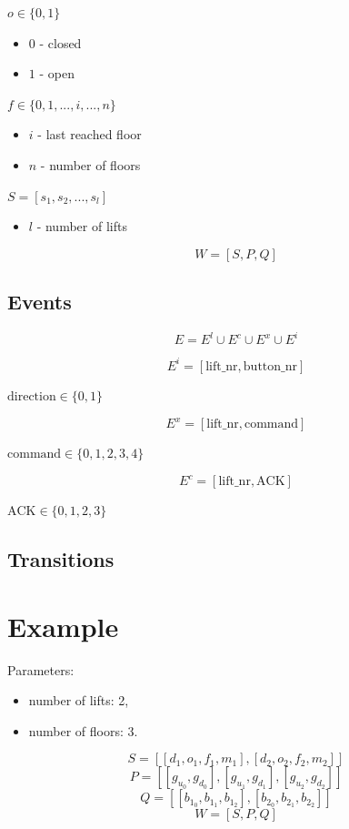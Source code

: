 \documentclass{article}
\begin{document}
\(o \in \{0,1\}\)
\begin{itemize}
  \item \(0\) - closed
  \item \(1\) - open
\end{itemize}

\(f \in \{0,1,...,i,...,n\}\)
\begin{itemize}
  \item \(i\) - last reached floor
  \item \(n\) - number of floors
\end{itemize}

\(S=[s_1, s_2, ..., s_l]\)
\begin{itemize}
  \item \(l\) - number of lifts
\end{itemize}

\[
W = [S, P, Q]
\]

\subsection{Events}

\[
E = E^l \cup E^c \cup E^x \cup E^i
\]

\[
E^i = [\text{lift\_nr},\text{button\_nr}]
\]

\(\text{direction} \in \{0,1\}\)

\[
E^x = [\text{lift\_nr}, \text{command}]
\]

\(\text{command} \in \{0,1,2,3,4\}\)

\[
E^c = [\text{lift\_nr}, \text{ACK}]
\]

\(\text{ACK} \in \{0,1,2,3\}\)

\subsection{Transitions}

\section{Example}

Parameters:
\begin{itemize}
  \item number of lifts: 2,
  \item number of floors: 3.
\end{itemize}

\[
S = [ [d_1, o_1, f_1, m_1], [d_2, o_2, f_2, m_2] ]
\]
\[
P = [ [g_{u_0}, g_{d_0}], [g_{u_1}, g_{d_1}], [g_{u_2}, g_{d_2}] ]
\]
\[
Q = [ [b_{1_0},b_{1_1},b_{1_2}], [b_{2_0},b_{2_1},b_{2_2}] ]
\]
\[
W=[S,P,Q]
\]
\end{document}
